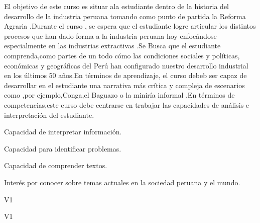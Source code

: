 \begin{syllabus}


\begin{justification}
El objetivo de este curso es situar ala estudiante dentro de la historia del desarrollo de la industria peruana tomando como punto de partida la Reforma Agraria .Durante el curso , se espera que el estudiante logre articular los distintos 
procesos que han dado forma a  la industria peruana hoy enfocándose  especialmente en las industrias extractivas .Se Busca que el estudiante  comprenda,como partes de un todo cómo las condiciones sociales y políticas,
económicas y geográficas del Perú  han configurado nuestro desarrollo industrial en los últimos 50 años.En términos de aprendizaje, el curso debeb ser capaz de desarrollar en el estudiante  una narrativa más crítica y compleja de escenarios como ,por ejemplo,Conga,el  Baguazo 
o la  miniría informal .En términos de competencias,este curso debe centrarse en  trabajar las capacidades de análisis e interpretación del estudiante.

\end{justification}

\begin{goals}
\item Capacidad de interpretar información.
\item Capacidad para identificar problemas.
\item Capacidad de comprender textos.
\item Interés por conocer sobre temas actuales en la sociedad peruana y el mundo. 
\end{goals}

\begin{outcomes}{V1}
    \item {} 
    \item {} 
    \item {} 
    \item {} 
    \item {} 
\end{outcomes}

\begin{competences}{V1}
    \item {}
    \item {}
    \item {}
    \item {}
\end{competences}


\end{syllabus}
